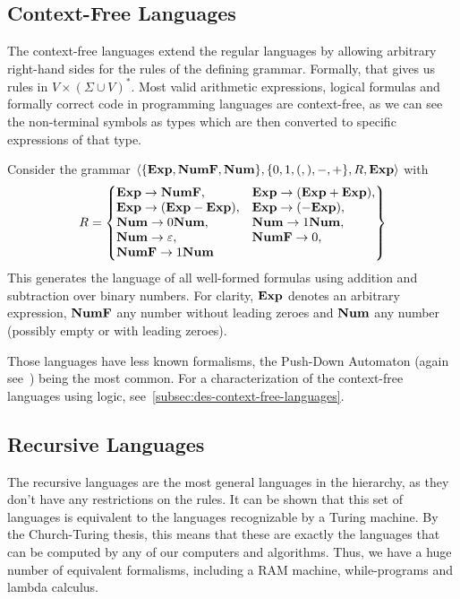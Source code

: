 \subsection{Context-Free Languages}\label{subsec:context-free-languages}

The context-free languages extend the regular languages by allowing arbitrary right-hand sides for the rules of the defining grammar.
Formally, that gives us rules in $V\times(\Sigma \cup V)^{*}$.
Most valid arithmetic expressions, logical formulas and formally correct code in programming languages are context-free, as we can see the non-terminal symbols as types which are then converted to specific expressions of that type.

\begin{exmp}
    Consider the grammar $\langle \{\bold{Exp}, \bold{NumF}, \bold{Num}\}, \{0, 1, (, ), -, +\}, R, \bold{Exp} \rangle$ with
    \[
        R = \begin{Bmatrix*}[l]
                \bold{Exp} \to \bold{NumF},
                &\bold{Exp} \to (\bold{Exp} + \bold{Exp}), \\
                \bold{Exp} \to (\bold{Exp} - \bold{Exp}),
                &\bold{Exp} \to (-\bold{Exp}), \\
                \bold{Num} \to 0\bold{Num},
                &\bold{Num} \to 1\bold{Num}, \\
                \bold{Num} \to \varepsilon,
                &\bold{NumF} \to 0, \\
                \bold{NumF} \to 1\bold{Num}
        \end{Bmatrix*}
    \]
    This generates the language of all well-formed formulas using addition and subtraction over binary numbers.
    For clarity, $\bold{Exp}$ denotes an arbitrary expression, $\bold{NumF}$ any number without leading zeroes and $\bold{Num}$ any number (possibly empty or with leading zeroes).
\end{exmp}

Those languages have less known formalisms, the Push-Down Automaton (again see~\cite{theory-cs}) being the most common.
For a characterization of the context-free languages using logic, see~\cref{subsec:des-context-free-languages}.

\subsection{Recursive Languages}\label{subsec:recursive-languages}

The recursive languages are the most general languages in the hierarchy, as they don't have any restrictions on the rules.
It can be shown that this set of languages is equivalent to the languages recognizable by a Turing machine.
By the Church-Turing thesis, this means that these are exactly the languages that can be computed by any of our computers and algorithms.
Thus, we have a huge number of equivalent formalisms, including a RAM machine, while-programs and lambda calculus.

